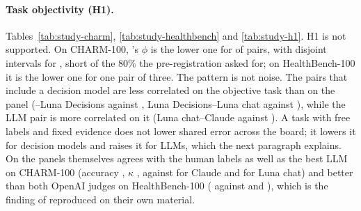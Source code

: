 \paragraph{Task objectivity (H1).} Tables~\ref{tab:study-charm}, \ref{tab:study-healthbench} and \ref{tab:study-h1}. H1 is not supported. On CHARM-100, \dc{}'s $\phi$ is the lower one for \studyHOneLowerCharmOneZeroZero{} of \studyHOneTotalCharmOneZeroZero{} pairs, with disjoint intervals for \studyHOneDisjointCharmOneZeroZero{}, short of the 80\% the pre-registration asked for; on HealthBench-100 it is the lower one for one pair of three. The pattern is not noise. The pairs that include a decision model are less correlated on the objective task than on the panel (\jev{}--Luna Decisions \studyPhiJevThreeLunaDecThree{} against \studyPanelPhiCharmOneZeroZeroJevLunaDec{}, Luna Decisions--Luna chat \studyPhiLunaDecThreeLunaChat{} against \studyPanelPhiCharmOneZeroZeroLunaDecLunaChat{}), while the LLM pair is more correlated on it (Luna chat--Claude \studyPhiLunaChatClaude{} against \studyPanelPhiCharmOneZeroZeroLunaChatClaude{}). A task with free labels and fixed evidence does not lower shared error across the board; it lowers it for decision models and raises it for LLMs, which the next paragraph explains. On the panels themselves \jev{} agrees with the human labels as well as the best LLM on CHARM-100 (accuracy \studyPanelAccCharmOneZeroZeroJev{}, $\kappa$ \studyPanelKappaCharmOneZeroZeroJev{}, against \studyPanelAccCharmOneZeroZeroClaude{} for Claude and \studyPanelAccCharmOneZeroZeroLunaChat{} for Luna chat) and better than both OpenAI judges on HealthBench-100 (\studyPanelAccHealthbenchOneZeroZeroTestJev{} against \studyPanelAccHealthbenchOneZeroZeroTestLunaChat{} and \studyPanelAccHealthbenchOneZeroZeroTestLunaDec{}), which is the finding of \citet{rao2026jev} reproduced on their own material.

\begin{table}[t]
\centering\small
{}
\caption{HealthBench-100 test (\studyPanelCellsHealthbenchOneZeroZeroTest{} criterion judgements with a physician majority label): agreement of each judge with the human labels.}
\label{tab:study-healthbench}
\end{table}

\begin{table}[t]
\centering\small
{}
\caption{Exploratory, not pre-registered: held-out items split by whether the passage carrying the original token is among the three passages selected for the altered sentence (present for \studyRetrievalShare{} of pairs).}
\label{tab:study-retrieval}
\end{table}

